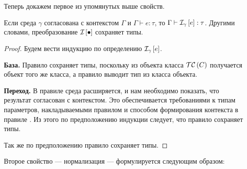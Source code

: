 Теперь докажем первое из упомянутых выше свойств.

\begin{Th}
Если среда $\gamma$ согласована с контекстом $\Gamma$ и \mbox{$\Gamma \vdash e : \tau$}, то \mbox{$\Gamma \vdash \mathcal{I}_{\gamma} \left[ e \right] : \tau$}. Другими словами, преобразование $\mathcal{I}_{} \left[ \bullet \right]$ сохраняет типы.
\end{Th}
\begin{proof}
Будем вести индукцию по определению $\mathcal{I}_{\gamma} \left[ e \right]$.

\noindent\textbf{База.} Правило  сохраняет типы, поскольку из объекта класса $\mathcal{TC}\left(C\right)$ получается объект того же класса, а правило  выводит тип из класса объекта.

\noindent\textbf{Переход.} 
В правиле  среда расширяется, и нам необходимо показать, что результат согласован с контекстом. Это обеспечивается требованиями к типам параметров, накладываемыми правилом  и способом формирования контекста в правиле . Из этого по предположению индукции следует, что правило  сохраняет типы.

Так же по предположению правило  сохраняет типы.
\end{proof}

Второе свойство --- нормализация --- формулируется следующим образом:

